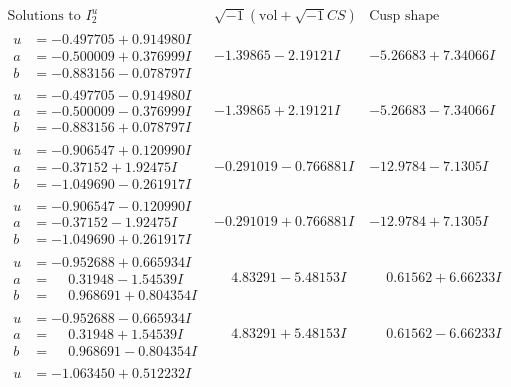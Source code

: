 \documentclass[1p]{elsarticle_modified}
\theoremstyle{definition}
\newcommand{\I}{\sqrt{-1}}
\begin{document}
$$\begin{array}{c|c|c}  
\text{Solutions to }I^u_{2}& \I (\text{vol} + \sqrt{-1}CS) & \text{Cusp shape}\\
 \hline 
\begin{aligned}
u &= -0.497705 + 0.914980 I \\
a &= -0.500009 + 0.376999 I \\
b &= -0.883156 - 0.078797 I\end{aligned}
 & -1.39865 - 2.19121 I & -5.26683 + 7.34066 I \\ \hline\begin{aligned}
u &= -0.497705 - 0.914980 I \\
a &= -0.500009 - 0.376999 I \\
b &= -0.883156 + 0.078797 I\end{aligned}
 & -1.39865 + 2.19121 I & -5.26683 - 7.34066 I \\ \hline\begin{aligned}
u &= -0.906547 + 0.120990 I \\
a &= -0.37152 + 1.92475 I \\
b &= -1.049690 - 0.261917 I\end{aligned}
 & -0.291019 - 0.766881 I & -12.9784 - 7.1305 I \\ \hline\begin{aligned}
u &= -0.906547 - 0.120990 I \\
a &= -0.37152 - 1.92475 I \\
b &= -1.049690 + 0.261917 I\end{aligned}
 & -0.291019 + 0.766881 I & -12.9784 + 7.1305 I \\ \hline\begin{aligned}
u &= -0.952688 + 0.665934 I \\
a &= \phantom{-}0.31948 - 1.54539 I \\
b &= \phantom{-}0.968691 + 0.804354 I\end{aligned}
 & \phantom{-}4.83291 - 5.48153 I & \phantom{-}0.61562 + 6.66233 I \\ \hline\begin{aligned}
u &= -0.952688 - 0.665934 I \\
a &= \phantom{-}0.31948 + 1.54539 I \\
b &= \phantom{-}0.968691 - 0.804354 I\end{aligned}
 & \phantom{-}4.83291 + 5.48153 I & \phantom{-}0.61562 - 6.66233 I \\ \hline\begin{aligned}
u &= -1.063450 + 0.512232 I \\

\end{aligned}
\end{array}$$
\end{document}

